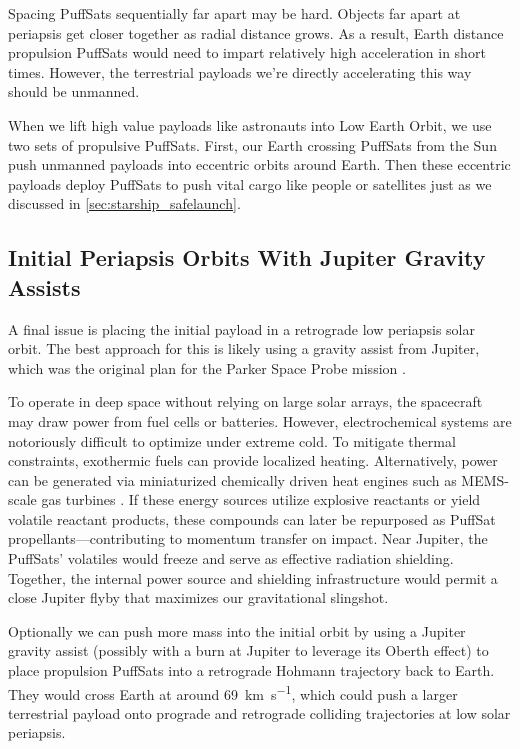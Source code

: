 \documentclass{article}
\begin{document}
{Spacing PuffSats sequentially far apart  may be hard.  Objects far apart at periapsis get closer together as radial distance grows.  As a result, Earth distance propulsion PuffSats would need to impart relatively high acceleration in short times.  However, the terrestrial payloads we're directly accelerating this way should be unmanned.   

When we lift high value payloads like astronauts into Low Earth Orbit, we use two sets of propulsive PuffSats. First, our Earth crossing PuffSats from the Sun push unmanned payloads into eccentric orbits around Earth. Then these eccentric payloads deploy PuffSats to push vital cargo like people or  satellites just as we discussed in \autoref{sec:starship_safelaunch}.

\subsection{Initial Periapsis Orbits With Jupiter Gravity Assists} \label{sec:jupiter_gravity_initial}
A final issue is placing the initial payload in a retrograde low periapsis solar orbit.  The best approach for this is likely using a gravity assist from Jupiter, which was the original plan for the Parker Space Probe mission \cite{mccomas2005solar}. 

To operate in deep space without relying on large solar arrays, the spacecraft may draw power from fuel cells or batteries. However, electrochemical systems are notoriously difficult to optimize under extreme cold. To mitigate thermal constraints, exothermic fuels can provide localized heating.  Alternatively, power can be generated via miniaturized chemically driven heat engines such as MEMS-scale gas turbines \cite{mems_gas_turbine}. If these energy sources utilize explosive reactants or yield volatile reactant products, these compounds can later be repurposed as PuffSat propellants---contributing to momentum transfer on impact. Near Jupiter, the PuffSats' volatiles would freeze and serve as effective radiation shielding. Together, the internal power source and shielding infrastructure would permit a close Jupiter flyby that maximizes our gravitational slingshot.

Optionally we can push more mass into the initial orbit by using a Jupiter gravity assist (possibly with a burn at Jupiter to leverage its Oberth effect) to place propulsion PuffSats into a retrograde Hohmann trajectory back to Earth.   They would cross Earth at around \SI{69}{\kilo\meter\per\second}, which could push a larger terrestrial payload onto  prograde and retrograde colliding trajectories at low solar periapsis.

}
\end{document}

